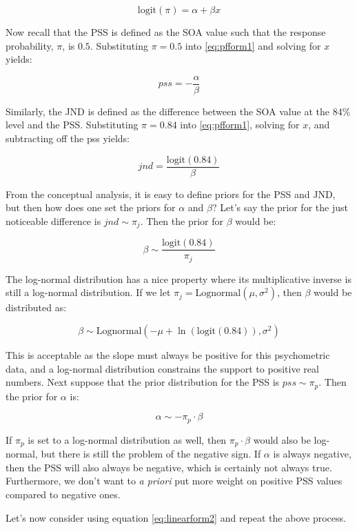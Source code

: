 \documentclass[11pt, oneside, openany]{scrbook}
\begin{document}
\begin{equation}
  \mathrm{logit}(\pi) = \alpha+\beta x
  \label{eq:pfform1}
\end{equation}

Now recall that the PSS is defined as the SOA value such that the response probability, \(\pi\), is \(0.5\). Substituting \(\pi = 0.5\) into \eqref{eq:pfform1} and solving for \(x\) yields:

\[pss = -\frac{\alpha}{\beta}\]

Similarly, the JND is defined as the difference between the SOA value at the 84\% level and the PSS. Substituting \(\pi = 0.84\) into \eqref{eq:pfform1}, solving for \(x\), and subtracting off the pss yields:

\begin{equation}
  jnd = \frac{\mathrm{logit}(0.84)}{\beta}
  \label{eq:jnd1}
\end{equation}

From the conceptual analysis, it is easy to define priors for the PSS and JND, but then how does one set the priors for \(\alpha\) and \(\beta\)? Let's say the prior for the just noticeable difference is \(jnd \sim \pi_j\). Then the prior for \(\beta\) would be:

\[\beta \sim \frac{\mathrm{logit}(0.84)}{\pi_j}\]

The log-normal distribution has a nice property where its multiplicative inverse is still a log-normal distribution. If we let \(\pi_j = \mathrm{Lognormal}(\mu, \sigma^2)\), then \(\beta\) would be distributed as:

\[
\beta \sim \mathrm{Lognormal}(-\mu + \ln(\mathrm{logit}(0.84)), \sigma^2)
\]

This is acceptable as the slope must always be positive for this psychometric data, and a log-normal distribution constrains the support to positive real numbers. Next suppose that the prior distribution for the PSS is \(pss \sim \pi_p\). Then the prior for \(\alpha\) is:

\[\alpha \sim -\pi_p \cdot \beta\]

If \(\pi_p\) is set to a log-normal distribution as well, then \(\pi_p \cdot \beta\) would also be log-normal, but there is still the problem of the negative sign. If \(\alpha\) is always negative, then the PSS will also always be negative, which is certainly not always true. Furthermore, we don't want to \emph{a priori} put more weight on positive PSS values compared to negative ones.

Let's now consider using equation \eqref{eq:linearform2} and repeat the above process.
\end{document}
